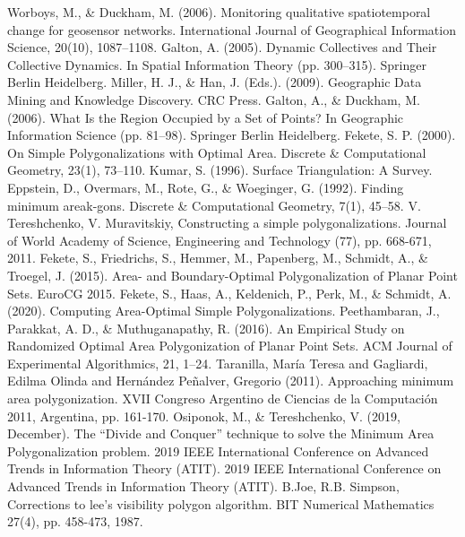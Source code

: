\documentclass[conference]{IEEEtran}
\begin{document}
	\begin{thebibliography}{00}
		 Worboys, M., \& Duckham, M. (2006). Monitoring qualitative spatiotemporal change for geosensor networks. International Journal of Geographical Information Science, 20(10), 1087–1108.
		 Galton, A. (2005). Dynamic Collectives and Their Collective Dynamics. In Spatial Information Theory (pp. 300–315). Springer Berlin Heidelberg.
		 Miller, H. J., \& Han, J. (Eds.). (2009). Geographic Data Mining and Knowledge Discovery. CRC Press.
		 Galton, A., \& Duckham, M. (2006). What Is the Region Occupied by a Set of Points? In Geographic Information Science (pp. 81–98). Springer Berlin Heidelberg.
		 Fekete, S. P. (2000). On Simple Polygonalizations with Optimal Area. Discrete \& Computational Geometry, 23(1), 73–110.
		 Kumar, S. (1996). Surface Triangulation: A Survey.
		 Eppstein, D., Overmars, M., Rote, G., \& Woeginger, G. (1992). Finding minimum areak-gons. Discrete \& Computational Geometry, 7(1), 45–58.
		 V. Tereshchenko, V. Muravitskiy, Constructing a simple polygonalizations. Journal of World Academy of Science, Engineering and Technology (77), pp. 668-671, 2011.
		 Fekete, S., Friedrichs, S., Hemmer, M., Papenberg, M., Schmidt, A., \& Troegel, J. (2015). Area- and Boundary-Optimal Polygonalization of Planar Point Sets. EuroCG 2015.
		 Fekete, S., Haas, A., Keldenich, P., Perk, M., \& Schmidt, A. (2020). Computing Area-Optimal Simple Polygonalizations.
		 Peethambaran, J., Parakkat, A. D., \& Muthuganapathy, R. (2016). An Empirical Study on Randomized Optimal Area Polygonization of Planar Point Sets. ACM Journal of Experimental Algorithmics, 21, 1–24.
		 Taranilla, María Teresa and Gagliardi, Edilma Olinda and Hernández Peñalver, Gregorio (2011). Approaching minimum area polygonization. XVII Congreso Argentino de Ciencias de la Computación 2011, Argentina, pp. 161-170.
		 Osiponok, M., \& Tereshchenko, V. (2019, December). The “Divide and Conquer” technique to solve the Minimum Area Polygonalization problem. 2019 IEEE International Conference on Advanced Trends in Information Theory (ATIT). 2019 IEEE International Conference on Advanced Trends in Information Theory (ATIT).
		 B.Joe, R.B. Simpson, Corrections to lee's visibility polygon algorithm. BIT Numerical Mathematics 27(4), pp. 458-473, 1987.
	\end{thebibliography}
\end{document}
